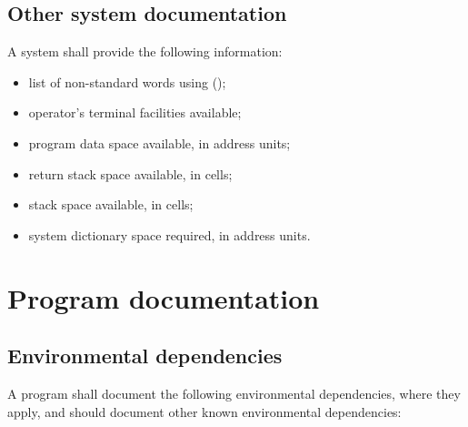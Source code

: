 \subsection{Other system documentation} %

A system shall provide the following information:

\begin{itemize}

\item list of non-standard words using 
	();

\item operator's terminal facilities available;

\item program data space available, in address units;

\item return stack space available, in cells;

\item stack space available, in cells;

\item system dictionary space required, in address units.
\end{itemize}



\section{Program documentation} %
\label{doc:program}

\subsection{Environmental dependencies} %
\label{doc:env}

A program shall document the following environmental dependencies,
where they apply, and should document other known environmental
dependencies:

